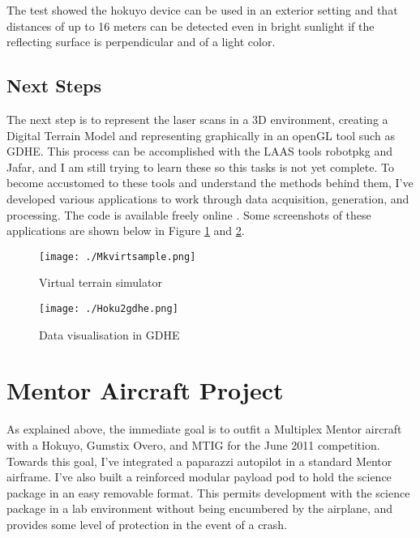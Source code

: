 \documentclass[a4paper,11pt]{report}
\begin{document}
The test showed the hokuyo device can be used in an exterior setting and that distances of up to 16 meters can be detected even in bright sunlight if the reflecting surface is perpendicular and of a light color.

\section{Next Steps}

The next step is to represent the laser scans in a 3D environment, creating a Digital Terrain Model and representing graphically in an openGL tool such as GDHE. This process can be accomplished with the LAAS tools robotpkg and Jafar, and I am still trying to learn these so this tasks is not yet complete. To become accustomed to these tools and understand the methods behind them, I've developed various applications to work through data acquisition, generation, and processing. The code is available freely online \cite{laserhawkgit}. Some screenshots of these applications are shown below in Figure \ref{fig:mkvirt} and \ref{fig:hoku2gdhe}.

\begin{figure}[ht]
 \centering
 \texttt{[image: ./Mkvirtsample.png]}
 \caption{Virtual terrain simulator}
 \label{fig:mkvirt}
\end{figure}

\begin{figure}[ht]
 \centering
 \texttt{[image: ./Hoku2gdhe.png]}
 \caption{Data visualisation in GDHE}
 \label{fig:hoku2gdhe}
\end{figure}


\chapter{Mentor Aircraft Project}
\label{sec:mentorproject}

As explained above, the immediate goal is to outfit a Multiplex Mentor aircraft with a Hokuyo, Gumstix Overo, and MTIG for the June 2011 competition. Towards this goal, I've integrated a paparazzi autopilot in a standard Mentor airframe. I've also built a reinforced modular payload pod to hold the science package in an easy removable format. This permits development with the science package in a lab environment without being encumbered by the airplane, and provides some level of protection in the event of a crash.
\end{document}
